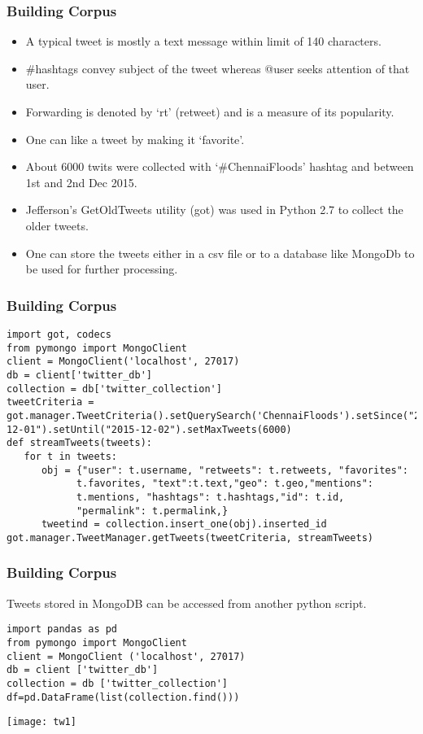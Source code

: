 \begin{frame}[fragile]\frametitle{Building Corpus}
  \begin{itemize}
  \item A typical tweet is mostly a text message within limit of 140 characters. 
  \item \#hashtags convey subject of the tweet whereas @user seeks attention of that user. 
  \item Forwarding is denoted by `rt' (retweet) and is a measure of its popularity. 
  \item One can like a tweet by making it `favorite'.
  \item About 6000 twits were collected with `\#ChennaiFloods' hashtag and between 1st and 2nd Dec 2015.  
  \item Jefferson's GetOldTweets utility (got) was used in Python 2.7 to collect the older tweets.
  \item One can store the tweets either in a csv file or to a database like MongoDb to be used for further processing.
  \end{itemize}
\end{frame}

\begin{frame}[fragile]\frametitle{Building Corpus}
  \begin{lstlisting}
import got, codecs
from pymongo import MongoClient 
client = MongoClient('localhost', 27017)
db = client['twitter_db']
collection = db['twitter_collection']
tweetCriteria = 
got.manager.TweetCriteria().setQuerySearch('ChennaiFloods').setSince("2015-12-01").setUntil("2015-12-02").setMaxTweets(6000)
def streamTweets(tweets):
   for t in tweets:
      obj = {"user": t.username, "retweets": t.retweets, "favorites":  
            t.favorites, "text":t.text,"geo": t.geo,"mentions": 
            t.mentions, "hashtags": t.hashtags,"id": t.id,
            "permalink": t.permalink,}
      tweetind = collection.insert_one(obj).inserted_id
got.manager.TweetManager.getTweets(tweetCriteria, streamTweets)
  \end{lstlisting}
\end{frame}

\begin{frame}[fragile]\frametitle{Building Corpus}
Tweets stored in MongoDB can be accessed from another python script. 
  \begin{lstlisting}
import pandas as pd
from pymongo import MongoClient
client = MongoClient ('localhost', 27017)
db = client ['twitter_db']
collection = db ['twitter_collection']
df=pd.DataFrame(list(collection.find()))
  \end{lstlisting}
  \begin{center}
\texttt{[image: tw1]}
\end{center}
\end{frame}

